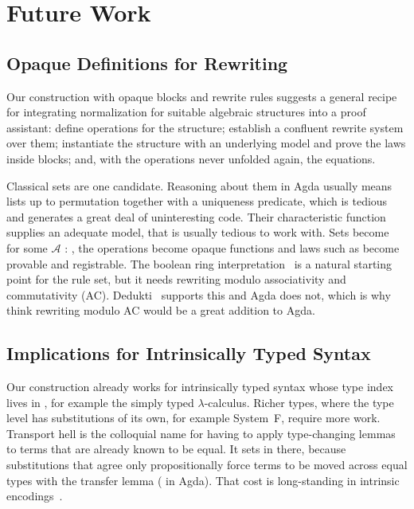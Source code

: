 \documentclass[sigplan,anonymous,review]{acmart}
\theoremstyle{acmdefinition}
\begin{document}
\section{Future Work}\label{sec:future}

\subsection{Opaque Definitions for Rewriting}
Our construction with opaque blocks and rewrite rules suggests a general recipe
for integrating normalization for suitable algebraic structures into a proof
assistant: define operations for the structure; establish a confluent rewrite
system over them; instantiate the structure with an underlying model and prove
the laws inside  blocks; and, with the operations never
unfolded again,  the equations.

Classical sets are one candidate. Reasoning about them in Agda usually means
lists up to permutation together with a uniqueness predicate, which is tedious
and generates a great deal of uninteresting code. Their characteristic function
supplies an adequate model, that is usually tedious to work with. Sets become
\ESetProp\, for some $\mathcal{A}$ :  , the
operations become opaque functions \ESetOps{} and laws such as \ESetLawEx{}
become provable and registrable. The boolean ring
interpretation~\cite{HSIANG1985255} is a natural starting point for the rule
set, but it needs rewriting modulo associativity and commutativity (AC).
Dedukti~\cite{assaf2023deduktilogicalframeworkbased} supports this and Agda
does not, which is why think rewriting modulo AC would be a great addition to
Agda.

\subsection{Implications for Intrinsically Typed Syntax}\label{sec:future-int}
Our construction already works for intrinsically typed syntax whose type index
lives in , for example the simply typed $λ$-calculus. Richer
types, where the type level has substitutions of its own, for example
System~F, require more work. Transport hell is the colloquial name for having
to apply type-changing lemmas to terms that are already known to be equal. It
sets in there, because substitutions that agree only propositionally force
terms to be moved across equal types with the transfer lemma
( in Agda). That cost is long-standing in intrinsic
encodings~\cite{stronglytyped}.
\end{document}
